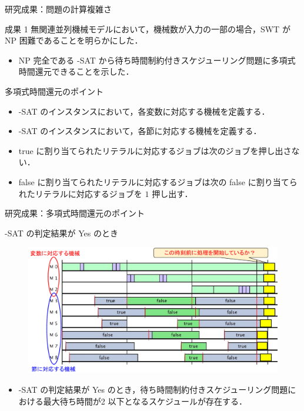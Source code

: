 \documentclass[dvipdfmx]{beamer}
\begin{document}
    \begin{frame}{研究成果：問題の計算複雑さ}
      \begin{alertblock}{成果 1}
        無関連並列機械モデルにおいて，機械数が入力の一部の場合，SWT が NP 困難であることを明らかにした．
        \begin{itemize}
          \item NP 完全である {-SAT} から待ち時間制約付きスケジューリング問題に多項式時間還元できることを示した．
        \end{itemize}
      \end{alertblock}
      \begin{block}{多項式時間還元のポイント}
        \begin{itemize}
          \item {-SAT} のインスタンスにおいて，\alert{各変数に対応する機械}を定義する．
          \item {-SAT} のインスタンスにおいて，\alert{各節に対応する機械}を定義する．
          \item \alert{true} に割り当てられたリテラルに対応するジョブは次のジョブを\alert{押し出さない}．
          \item \alert{false} に割り当てられたリテラルに対応するジョブは次の \alert{false} に割り当てられたリテラルに対応するジョブを \alert{$1$ 押し出す}．
        \end{itemize}
      \end{block}
    \end{frame}

    \begin{frame}{研究成果：多項式時間還元のポイント}
      \begin{block}{{-SAT} の判定結果が Yes のとき}
        \begin{figure}[h]
          \centering
          \includegraphics[width=12cm]{figure/reduction1.pdf}
        \end{figure}
      \end{block}
      \begin{itemize}
        \setlength{\leftskip}{-3mm}
        \item {-SAT} の判定結果が \alert{Yes} のとき，待ち時間制約付きスケジューリング問題における最大待ち時間が\alert{2 以下}となるスケジュールが\alert{存在する}．
      \end{itemize}
    \end{frame}
\end{document}
